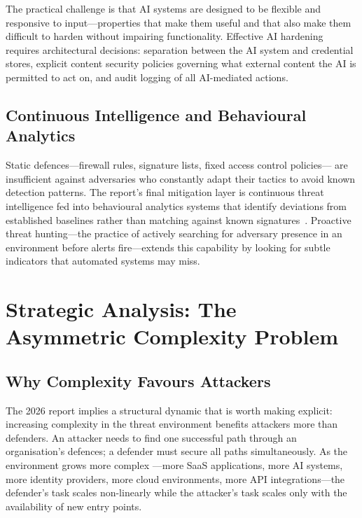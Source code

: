 \documentclass[journal]{IEEEtran}
\begin{document}
The practical challenge is that AI systems are designed to be flexible and
responsive to input---properties that make them useful and that also make them
difficult to harden without impairing functionality. Effective AI hardening requires
architectural decisions: separation between the AI system and credential stores,
explicit content security policies governing what external content the AI is
permitted to act on, and audit logging of all AI-mediated actions.

\subsection{Continuous Intelligence and Behavioural Analytics}

Static defences---firewall rules, signature lists, fixed access control policies---
are insufficient against adversaries who constantly adapt their tactics to avoid
known detection patterns. The report's final mitigation layer is continuous threat
intelligence fed into behavioural analytics systems that identify deviations from
established baselines rather than matching against known signatures~\cite{cs2026press}.
Proactive threat hunting---the practice of actively searching for adversary presence
in an environment before alerts fire---extends this capability by looking for subtle
indicators that automated systems may miss.

\section{Strategic Analysis: The Asymmetric Complexity Problem}

\subsection{Why Complexity Favours Attackers}

The 2026 report implies a structural dynamic that is worth making explicit: increasing
complexity in the threat environment benefits attackers more than defenders. An
attacker needs to find one successful path through an organisation's defences; a
defender must secure all paths simultaneously. As the environment grows more complex
---more SaaS applications, more AI systems, more identity providers, more cloud
environments, more API integrations---the defender's task scales non-linearly while
the attacker's task scales only with the availability of new entry points.
\end{document}
